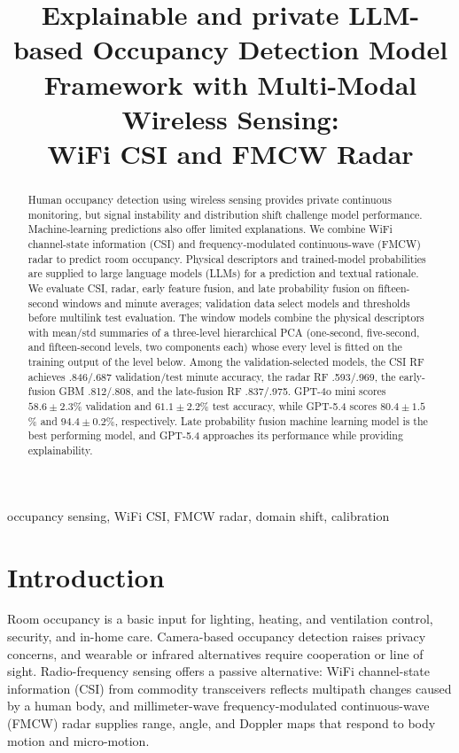 \documentclass[conference,10pt,letterpaper]{IEEEtran}
\title{Explainable and private LLM-based Occupancy Detection Model Framework with Multi-Modal Wireless Sensing:\\WiFi CSI and FMCW Radar}
\author{\IEEEauthorblockN{Gad Gad\IEEEauthorrefmark{1}, Mostafa Fouda\IEEEauthorrefmark{2}, Zubair Md Fadlullah\IEEEauthorrefmark{1}}
\IEEEauthorblockA{\IEEEauthorrefmark{1}Department of Computer Science, Western University, London, ON, Canada\\
\IEEEauthorrefmark{2}Department of Electrical and Computer Engineering, Idaho State University, Pocatello, ID, USA}}
\begin{document}
\maketitle
\begin{abstract}

Human occupancy detection using wireless sensing provides private continuous monitoring, but signal instability and distribution shift challenge model performance. Machine-learning predictions also offer limited explanations. We combine WiFi channel-state information (CSI) and frequency-modulated continuous-wave (FMCW) radar to predict room occupancy. Physical descriptors and trained-model probabilities are supplied to large language models (LLMs) for a prediction and textual rationale. We evaluate CSI, radar, early feature fusion, and late probability fusion on fifteen-second windows and minute averages; validation data select models and thresholds before multilink test evaluation. The window models combine the physical descriptors with mean/std summaries of a three-level hierarchical PCA (one-second, five-second, and fifteen-second levels, two components each) whose every level is fitted on the training output of the level below. Among the validation-selected models, the CSI RF achieves .846/.687 validation/test minute accuracy, the radar RF .593/.969, the early-fusion GBM .812/.808, and the late-fusion RF .837/.975. GPT-4o mini scores $58.6\pm2.3$\% validation and $61.1\pm2.2$\% test accuracy, while GPT-5.4 scores $80.4\pm1.5$\% and $94.4\pm0.2$\%, respectively. Late probability fusion machine learning model is the best performing model, and GPT-5.4 approaches its performance while providing explainability.

\end{abstract}
\begin{IEEEkeywords}
occupancy sensing, WiFi CSI, FMCW radar, domain shift, calibration
\end{IEEEkeywords}

\section{Introduction}\label{sec:intro}
Room occupancy is a basic input for lighting, heating, and ventilation control, security, and in-home care. Camera-based occupancy detection raises privacy concerns, and wearable or infrared alternatives require cooperation or line of sight. Radio-frequency sensing offers a passive alternative: WiFi channel-state information (CSI) from commodity transceivers reflects multipath changes caused by a human body, and millimeter-wave frequency-modulated continuous-wave (FMCW) radar supplies range, angle, and Doppler maps that respond to body motion and micro-motion.
\end{document}
